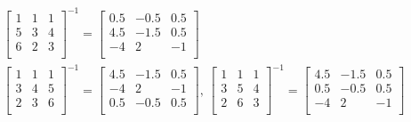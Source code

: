 \begin{enumerate}[\bfseries S1.]
\begin{equation*}
\begin{split}
\begin{bmatrix}
            1&     1&     1\\
            5&     3&     4\\
            6&     2&     3\\
        \end{bmatrix}^{-1}=\begin{bmatrix}
            0.5&   -0.5&    0.5\\
            4.5&   -1.5&    0.5\\
             -4&    2  &    -1\\
        \end{bmatrix}\\
        \begin{bmatrix}
            1&     1&     1\\
            3&     4&     5\\
            2&     3&     6\\
        \end{bmatrix}^{-1}=\begin{bmatrix}
            4.5 &  -1.5&    0.5\\
            -4  &    2 &     -1\\
             0.5&  -0.5&    0.5\\
        \end{bmatrix},\,
        \begin{bmatrix}
            1&     1&     1\\
            3&     5&     4\\
            2&     6&     3\\
        \end{bmatrix}^{-1}=\begin{bmatrix}
            4.5&   -1.5&    0.5\\
            0.5&   -0.5&    0.5\\
           -4&    2&   -1\\
        \end{bmatrix}\\
    \end{split}
    \end{equation*}
\end{enumerate}
